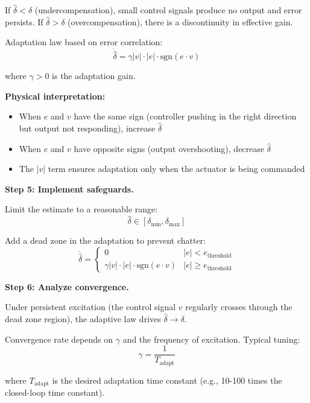 \begin{example}
If $\hat{\delta} < \delta$ (undercompensation), small control signals produce no output and error persists.
If $\hat{\delta} > \delta$ (overcompensation), there is a discontinuity in effective gain.

Adaptation law based on error correlation:
\begin{equation}
\dot{\hat{\delta}} = \gamma |v| \cdot |e| \cdot \text{sgn}(e \cdot v)
\end{equation}

where $\gamma > 0$ is the adaptation gain.

\textbf{Physical interpretation:}
\begin{itemize}
    \item When $e$ and $v$ have the same sign (controller pushing in the right direction but output not responding), increase $\hat{\delta}$
    \item When $e$ and $v$ have opposite signs (output overshooting), decrease $\hat{\delta}$
    \item The $|v|$ term ensures adaptation only when the actuator is being commanded
\end{itemize}

\textbf{Step 5: Implement safeguards.}

Limit the estimate to a reasonable range:
\begin{equation}
\hat{\delta} \in [\delta_{\min}, \delta_{\max}]
\end{equation}

Add a dead zone in the adaptation to prevent chatter:
\begin{equation}
\dot{\hat{\delta}} = \begin{cases}
0 & |e| < e_{\text{threshold}} \\
\gamma |v| \cdot |e| \cdot \text{sgn}(e \cdot v) & |e| \geq e_{\text{threshold}}
\end{cases}
\end{equation}

\textbf{Step 6: Analyze convergence.}

Under persistent excitation (the control signal $v$ regularly crosses through the dead zone region), the adaptive law drives $\hat{\delta} \to \delta$.

Convergence rate depends on $\gamma$ and the frequency of excitation. Typical tuning:
\begin{equation}
\gamma = \frac{1}{T_{\text{adapt}}}
\end{equation}

where $T_{\text{adapt}}$ is the desired adaptation time constant (e.g., 10-100 times the closed-loop time constant).
\end{example}

